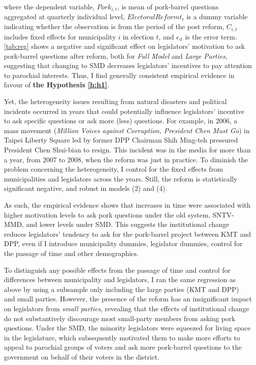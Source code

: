 where the dependent variable, $Pork_{i,t}$, is mean of pork-barrel questions aggregated at quarterly individual level, $ElectoralReformt_{t}$ is a dummy variable indicating whether the observation is  from the period of the post reform, $C_{i,t}$ includes fixed effects for municipality $i$ in election $t$, and $\epsilon_{it}$ is the error term. \autoref{tab:reg} shows a negative and significant effect on legislators' motivation to ask pork-barrel questions after reform, both for \textit{Full Model} and \textit{Large Parties}, suggesting that changing to SMD decreases legislators' incentives to pay attention to parochial interests. Thus, I find generally consistent empirical evidence in favour of \textbf{the Hypothesis \ref{h:h1}}. 

Yet, the heterogeneity issues resulting from natural disasters and political incidents occurred in years that could potentially influence legislators' incentive to ask specific questions or ask more (less) questions. For example, in 2006, a mass movement (\textit{Million Voices against Corruption, President Chen Must Go}) in Taipei Liberty Square led by former DPP Chairman Shih Ming-teh pressured President Chen Shui-bian to resign. This incident was in the media for more than a year, from 2007 to 2008, when the reform was just in practice. To diminish the problem concerning the heterogeneity, I control for the fixed effects from municipalities and legislators across the years. Still, the reform is statistically significant negative, and robust in models (2) and (4). 

As such, the empirical evidence shows that increases in time were associated with higher motivation levels to ask pork questions under the old system, SNTV-MMD, and lower levels under SMD. This suggests the institutional change reduces legislators' tendency to ask for the pork-barrel project between KMT and DPP, even if I introduce municipality dummies, legislator dummies, control for the passage of time and other demographics. 



To distinguish any possible effects from the passage of time and control for differences between municipality and legislators, I ran the same regression as above by using a subsample only including the large parties (KMT and DPP) and small parties. However, the presence of the reform has an insignificant impact on legislators from \textit{small parties}, revealing that the effects of institutional change do not substantively discourage most small-party members from asking pork questions. Under the SMD, the minority legislators were squeezed for living space in the legislature, which subsequently motivated them to make more efforts to appeal to parochial groups of voters and ask more pork-barrel questions to the government on behalf of their voters in the district. 

